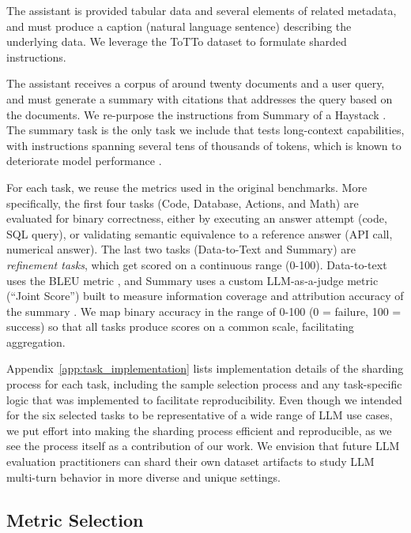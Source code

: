 \documentclass{article}
\begin{document}
 The assistant is provided tabular data and several elements of related metadata, and must produce a caption (natural language sentence) describing the underlying data. We leverage the ToTTo \cite{parikh2020totto} dataset to formulate sharded instructions. 

 The assistant receives a corpus of around twenty documents and a user query, and must generate a summary with citations that addresses the query based on the documents. We re-purpose the instructions from Summary of a Haystack \cite{laban2024summary}. The summary task is the only task we include that tests long-context capabilities, with instructions spanning several tens of thousands of tokens, which is known to deteriorate model performance \cite{huang2023embrace,karpinska2024one,kim2024fables}.

For each task, we reuse the metrics used in the original benchmarks. More specifically, the first four tasks (Code, Database, Actions, and Math) are evaluated for binary correctness, either by executing an answer attempt (code, SQL query), or validating semantic equivalence to a reference answer (API call, numerical answer). The last two tasks (Data-to-Text and Summary) are \textit{refinement tasks}, which get scored on a continuous range (0-100). Data-to-text uses the BLEU metric \cite{papineni2002bleu}, and Summary uses a custom LLM-as-a-judge metric (``Joint Score'') built to measure information coverage and attribution accuracy of the summary \cite{laban2024summary}. We map binary accuracy in the range of 0-100 (0 = failure, 100 = success) so that all tasks produce scores on a common scale, facilitating aggregation.

Appendix~\ref{app:task_implementation} lists implementation details of the sharding process for each task, including the sample selection process and any task-specific logic that was implemented to facilitate reproducibility. Even though we intended for the six selected tasks to be representative of a wide range of LLM use cases, we put effort into making the sharding process efficient and reproducible, as we see the process itself as a contribution of our work. We envision that future LLM evaluation practitioners can shard their own dataset artifacts to study LLM multi-turn behavior in more diverse and unique settings.

\subsection{Metric Selection} \label{sec:metrics}
\end{document}
